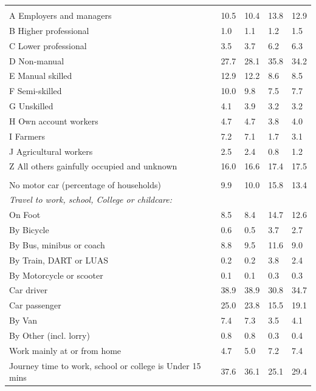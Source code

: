 \documentclass{article}
\begin{document}
\begin{table}[h]
\begin{tabular}{KTTTT}
\hline
    \\ 
    \hline
A Employers and managers & 10.5& 10.4& 13.8& 12.9\\
B Higher professional & 1.0& 1.1& 1.2& 1.5\\
C Lower professional & 3.5& 3.7& 6.2& 6.3\\
D Non-manual & 27.7& 28.1& 35.8& 34.2\\
E Manual skilled & 12.9& 12.2&  8.6&  8.5\\
F Semi-skilled & 10.0&  9.8&  7.5&  7.7\\
G Unskilled & 4.1& 3.9& 3.2& 3.2\\
H Own account workers & 4.7& 4.7& 3.8& 4.0\\
I Farmers & 7.2& 7.1& 1.7& 3.1\\
J Agricultural workers & 2.5& 2.4& 0.8& 1.2\\
Z All others gainfully occupied and unknown & 16.0& 16.6& 17.4& 17.5\\
\hline
{}\hline
    \\ 
    \hline
No motor car (percentage of households) &  9.9& 10.0& 15.8& 
13.4\\
    \hline 
\emph{Travel to work, school, College or childcare:} & & & \\
\quad On Foot &  8.5&  8.4& 14.7& 12.6\\ 
\quad By Bicycle & 0.6& 0.5& 3.7& 2.7\\ 
\quad By Bus, minibus or coach &  8.8&  9.5& 11.6&  9.0\\
\quad By Train, DART or LUAS & 0.2& 0.2& 3.8& 2.4\\
\quad By Motorcycle or scooter & 0.1& 0.1& 0.3& 0.3\\
\quad Car driver & 38.9 & 38.9& 30.8& 34.7\\
\quad Car passenger & 25.0& 23.8& 15.5& 19.1\\
\quad By Van & 7.4& 7.3& 3.5& 4.1\\
\quad By Other (incl. lorry) & 0.8& 0.8& 0.3& 0.4\\
    \hline
Work mainly at or from home & 4.7& 5.0& 7.2& 7.4\\
Journey time to work, school or college is Under 15 mins & 37.6& 36.1& 25.1& 29.4\\

\end{tabular}
\end{table}
\end{document}
